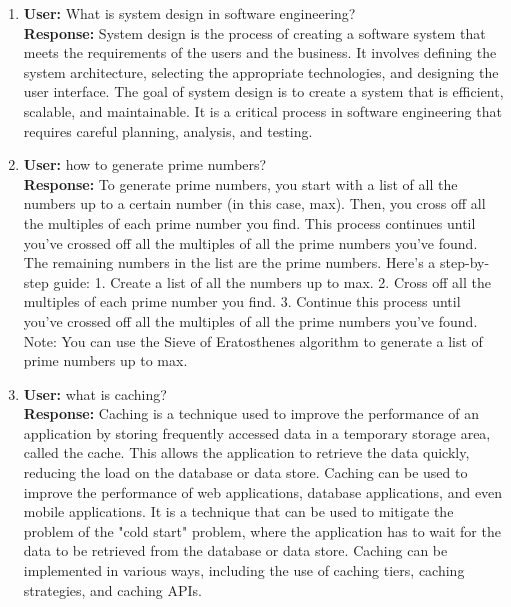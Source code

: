 \begin{enumerate}[label=\arabic*.]

    
\item \textbf{User:} What is system design in software engineering?
\\ \textbf{Response:} System design is the process of creating a software system that meets the requirements of the users and the business. It involves defining the system architecture, selecting the appropriate technologies, and designing the user interface. The goal of system design is to create a system that is efficient, scalable, and maintainable. It is a critical process in software engineering that requires careful planning, analysis, and testing.



\item \textbf{User:} how to generate prime numbers?
\\ \textbf{Response:}
To generate prime numbers, you start with a list of all the numbers up to a certain number (in this case, max). Then, you cross off all the multiples of each prime number you find. This process continues until you've crossed off all the multiples of all the prime numbers you've found. The remaining numbers in the list are the prime numbers.
Here's a step-by-step guide:
1. Create a list of all the numbers up to max.
2. Cross off all the multiples of each prime number you find.
3. Continue this process until you've crossed off all the multiples of all the prime numbers you've found.
Note: You can use the Sieve of Eratosthenes algorithm to generate a list of prime numbers up to max.


\item \textbf{User:} what is caching?
\\ \textbf{Response:}
Caching is a technique used to improve the performance of an application by storing frequently accessed data in a temporary storage area, called the cache. This allows the application to retrieve the data quickly, reducing the load on the database or data store. Caching can be used to improve the performance of web applications, database applications, and even mobile applications. It is a technique that can be used to mitigate the problem of the "cold start" problem, where the application has to wait for the data to be retrieved from the database or data store. Caching can be implemented in various ways, including the use of caching tiers, caching strategies, and caching APIs.

\end{enumerate}

